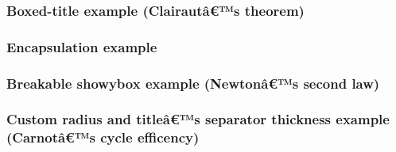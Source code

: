 \subsubsection{Boxed-title example (Clairautâ€™s
theorem)}\label{boxed-title-example-clairautuxe2s-theorem}

\subsubsection{\texorpdfstring{\protect{}}{Encapsulation}}\label{encapsulation-1}

\subsubsection{Encapsulation example}\label{encapsulation-example}

\subsubsection{\texorpdfstring{\protect{}}{Encapsulation}}\label{encapsulation-2}

\subsubsection{Breakable showybox example (Newtonâ€™s second
law)}\label{breakable-showybox-example-newtonuxe2s-second-law}

\subsubsection{\texorpdfstring{\protect{}}{Enabling breakable}}\label{enabling-breakable}

\subsubsection{Custom radius and titleâ€™s separator thickness example
(Carnotâ€™s cycle
efficency)}\label{custom-radius-and-titleuxe2s-separator-thickness-example-carnotuxe2s-cycle-efficency}

